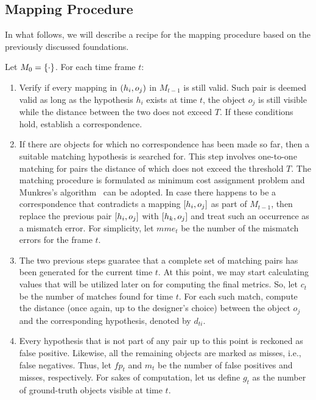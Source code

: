 \subsection{Mapping Procedure}

In what follows, we will describe a recipe for the mapping procedure based on the previously discussed foundations. 

Let $M_0 = \left\{ {\cdot} \right\}$. For each time frame $t$:
\begin{enumerate}
    \item Verify if every mapping in $\left( {h_i, o_j} \right)$ in $M_{t - 1}$ is still valid. Such pair is deemed valid as long as the hypothesis $h_i$ exists at time $t$, the object $o_j$ is still visible while the distance between the two does not exceed $T$. If these conditions hold, establish a correspondence.
    \item If there are objects for which no correspondence has been made so far, then a suitable matching hypothesis is searched for. This step involves one-to-one matching for pairs the distance of which does not exceed the threshold $T$. The matching procedure is formulated as minimum cost assignment problem and Munkres's algorithm~\cite{Munkres1957Assignment} can be adopted. In case there happens to be a correspondence that contradicts a mapping $\left[ {h_i, o_j} \right]$ as part of $M_{t - 1}$, then replace the previous pair $\left[ {h_i, o_j} \right]$ with $\left[ {h_k, o_j} \right]$ and treat such an occurrence as a mismatch error. For simplicity, let $mme_t$ be the number of the mismatch errors for the frame $t$.
    \item The two previous steps guaratee that a complete set of matching pairs has been generated for the current time $t$. At this point, we may start calculating values that will be utilized later on for computing the final metrics. So, let $c_t$ be the number of matches found for time $t$. For each such match, compute the distance (once again, up to the designer's choice) between the object $o_j$ and the corresponding hypothesis, denoted by $d_{ti}$.
    \item Every hypothesis that is not part of any pair up to this point is reckoned as false positive. Likewise, all the remaining objects are marked as misses, i.e., false negatives. Thus, let $fp_t$ and $m_t$ be the number of false positives and misses, respectively. For sakes of computation, let us define $g_t$ as the number of ground-truth objects visible at time $t$.
\end{enumerate}

